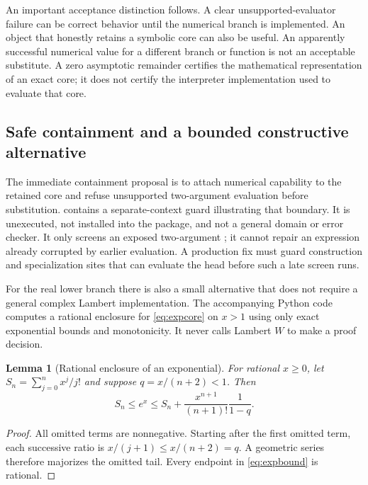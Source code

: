 \documentclass[11pt,letterpaper]{article}
\newcommand{\code}[1]{\texttt{\detokenize{#1}}}
\newtheorem{lemma}{Lemma}
\begin{document}
An important acceptance distinction follows. A clear unsupported-evaluator failure can be correct behavior until the numerical branch is implemented. An object that honestly retains a symbolic core can also be useful. An apparently successful numerical value for a different branch or function is not an acceptable substitute. A zero asymptotic remainder certifies the mathematical representation of an exact core; it does not certify the interpreter implementation used to evaluate that core.

\subsection{Safe containment and a bounded constructive alternative}

The immediate containment proposal is to attach numerical capability to the retained core and refuse unsupported two-argument evaluation before substitution.  contains a separate-context guard illustrating that boundary. It is unexecuted, not installed into the package, and not a general domain or error checker. It only screens an exposed two-argument \code{ProductLog}; it cannot repair an expression already corrupted by earlier evaluation. A production fix must guard construction and specialization sites that can evaluate the head before such a late screen runs.

For the real lower branch there is also a small alternative that does not require a general complex Lambert implementation. The accompanying Python code computes a rational enclosure for \eqref{eq:expcore} on $x>1$ using only exact exponential bounds and monotonicity. It never calls Lambert $W$ to make a proof decision.

\begin{lemma}[Rational enclosure of an exponential]\label{lem:exp}
For rational $x\ge0$, let $S_n=\sum_{j=0}^n x^j/j!$ and suppose $q=x/(n+2)<1$. Then
\begin{equation}\label{eq:expbound}
 S_n\le e^x\le S_n+
       \frac{x^{n+1}}{(n+1)!}\frac{1}{1-q}.
\end{equation}
\end{lemma}
\begin{proof}
All omitted terms are nonnegative. Starting after the first omitted term, each successive ratio is $x/(j+1)\le x/(n+2)=q$. A geometric series therefore majorizes the omitted tail. Every endpoint in \eqref{eq:expbound} is rational.
\end{proof}
\end{document}
